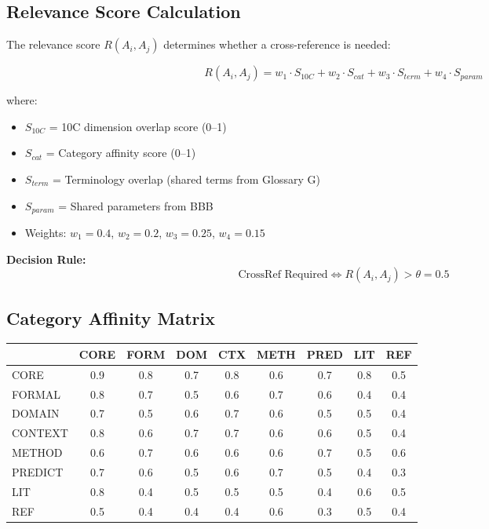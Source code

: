 \subsection{Relevance Score Calculation}

The relevance score $R(A_i, A_j)$ determines whether a cross-reference is needed:

\begin{equation}
R(A_i, A_j) = w_1 \cdot S_{10C} + w_2 \cdot S_{cat} + w_3 \cdot S_{term} + w_4 \cdot S_{param}
\end{equation}

where:
\begin{itemize}[nosep]
\item $S_{10C}$ = 10C dimension overlap score (0--1)
\item $S_{cat}$ = Category affinity score (0--1)
\item $S_{term}$ = Terminology overlap (shared terms from Glossary G)
\item $S_{param}$ = Shared parameters from BBB
\item Weights: $w_1 = 0.4$, $w_2 = 0.2$, $w_3 = 0.25$, $w_4 = 0.15$
\end{itemize}

\textbf{Decision Rule:}
\begin{equation}
\text{CrossRef Required} \Leftrightarrow R(A_i, A_j) > \theta = 0.5
\end{equation}


\subsection{Category Affinity Matrix}

\begin{center}
\begin{tabular}{|l|cccccccc|}
\hline
& CORE & FORM & DOM & CTX & METH & PRED & LIT & REF \\
\hline
CORE & 0.9 & 0.8 & 0.7 & 0.8 & 0.6 & 0.7 & 0.8 & 0.5 \\
FORMAL & 0.8 & 0.7 & 0.5 & 0.6 & 0.7 & 0.6 & 0.4 & 0.4 \\
DOMAIN & 0.7 & 0.5 & 0.6 & 0.7 & 0.6 & 0.5 & 0.5 & 0.4 \\
CONTEXT & 0.8 & 0.6 & 0.7 & 0.7 & 0.6 & 0.6 & 0.5 & 0.4 \\
METHOD & 0.6 & 0.7 & 0.6 & 0.6 & 0.6 & 0.7 & 0.5 & 0.6 \\
PREDICT & 0.7 & 0.6 & 0.5 & 0.6 & 0.7 & 0.5 & 0.4 & 0.3 \\
LIT & 0.8 & 0.4 & 0.5 & 0.5 & 0.5 & 0.4 & 0.6 & 0.5 \\
REF & 0.5 & 0.4 & 0.4 & 0.4 & 0.6 & 0.3 & 0.5 & 0.4 \\
\hline
\end{tabular}
\end{center}


